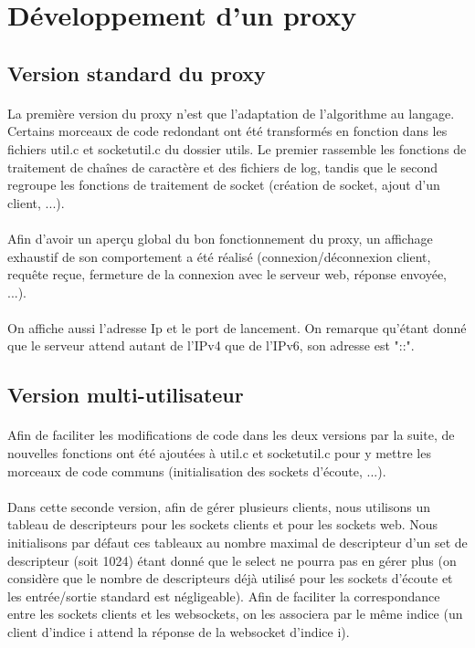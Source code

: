 \section{Développement d'un proxy}

\subsection{Version standard du proxy}

\paragraph{}
La première version du proxy n'est que l'adaptation de l'algorithme au langage. Certains morceaux de code redondant ont été transformés en fonction dans les fichiers util.c et socketutil.c du dossier utils. Le premier rassemble les fonctions de traitement de chaînes de caractère et des fichiers de log, tandis que le second regroupe les fonctions de traitement de socket (création de socket, ajout d'un client, ...).
\paragraph{}
Afin d'avoir un aperçu global du bon fonctionnement du proxy, un affichage exhaustif de son comportement a été réalisé (connexion/déconnexion client, requête reçue, fermeture de la connexion avec le serveur web, réponse envoyée, ...). 
\paragraph{}
On affiche aussi l'adresse Ip et le port de lancement. On remarque qu'étant donné que le serveur attend autant de l'IPv4 que de l'IPv6, son adresse est "::". 

\subsection{Version multi-utilisateur}
\paragraph{}
Afin de faciliter les modifications de code dans les deux versions par la suite, de nouvelles fonctions ont été ajoutées à util.c et socketutil.c pour y mettre les morceaux de code communs (initialisation des sockets d'écoute, ...).
\paragraph{}
Dans cette seconde version, afin de gérer plusieurs clients, nous utilisons un tableau de descripteurs pour les sockets clients et pour les sockets web. Nous initialisons par défaut ces tableaux au nombre maximal de descripteur d'un set de descripteur (soit 1024) étant donné que le select ne pourra pas en gérer plus (on considère que le nombre de descripteurs déjà utilisé pour les sockets d'écoute et les entrée/sortie standard est négligeable). \linebreak
Afin de faciliter la correspondance entre les sockets clients et les websockets, on les associera par le même indice (un client d'indice i attend la réponse de la websocket d'indice i).

